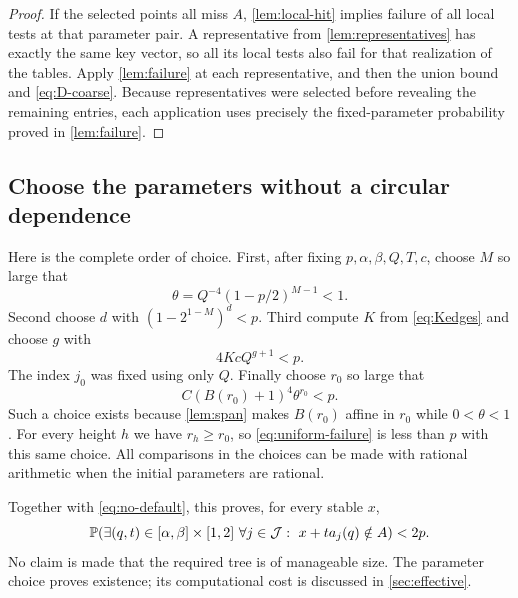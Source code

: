 \begin{proof}
If the selected points all miss $A$, \cref{lem:local-hit} implies
failure of all local tests at that parameter pair. A representative
from \cref{lem:representatives} has exactly the same key vector, so
all its local tests also fail for that realization of the tables.
Apply \cref{lem:failure} at each representative, and then the union
bound and \eqref{eq:D-coarse}. Because representatives were selected
before revealing the remaining entries, each application uses precisely
the fixed-parameter probability proved in \cref{lem:failure}.
\end{proof}

\subsection{Choose the parameters without a circular dependence}

Here is the complete order of choice.
First, after fixing $p,\alpha,\beta,Q,T,c$, choose $M$ so large that
\begin{equation}\label{eq:theta}
 \theta=Q^{-4}(1-p/2)^{M-1}<1.
\end{equation}
Second choose $d$ with $(1-2^{1-M})^d<p$.
Third compute $K$ from \eqref{eq:Kedges} and choose $g$ with
\begin{equation}\label{eq:gap-choice}
 4KcQ^{g+1}<p.
\end{equation}
The index $j_0$ was fixed using only $Q$.
Finally choose $r_0$ so large that
\begin{equation}\label{eq:base-length-choice}
 C(B(r_0)+1)^4\theta^{r_0}<p.
\end{equation}
Such a choice exists because \cref{lem:span} makes $B(r_0)$ affine
in $r_0$ while $0<\theta<1$. For every height $h$ we have
$r_h\ge r_0$, so \eqref{eq:uniform-failure} is less than $p$ with
this same choice. All comparisons in the choices can be made with
rational arithmetic when the initial parameters are rational.

Together with \eqref{eq:no-default}, this proves, for every stable $x$,
\begin{equation}\label{eq:pointwise-miss}
 \mathbb P\!\left(\exists(q,t)\in[\alpha,\beta]\times[1,2]
  \ \forall j\in\mathcal J:\ x+ta_j(q)\notin A\right)<2p.
\end{equation}
No claim is made that the required tree is of manageable size. The
parameter choice proves existence; its computational cost is discussed
in \cref{sec:effective}.

